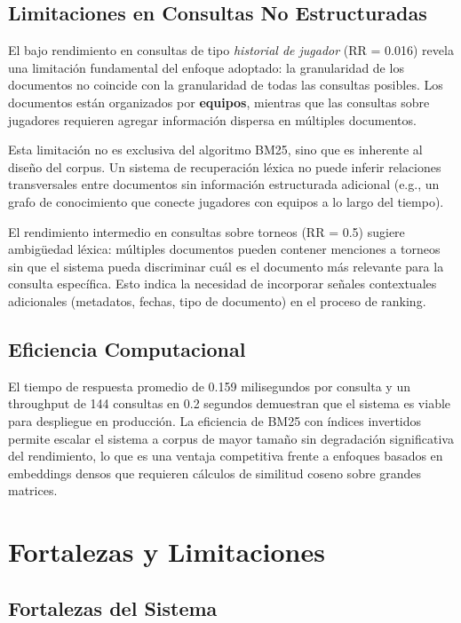 \subsection{Limitaciones en Consultas No Estructuradas}

El bajo rendimiento en consultas de tipo \textit{historial de jugador} (RR = 0.016) revela una limitación fundamental del enfoque adoptado: la granularidad de los documentos no coincide con la granularidad de todas las consultas posibles. Los documentos están organizados por \textbf{equipos}, mientras que las consultas sobre jugadores requieren agregar información dispersa en múltiples documentos.

Esta limitación no es exclusiva del algoritmo BM25, sino que es inherente al diseño del corpus. Un sistema de recuperación léxica no puede inferir relaciones transversales entre documentos sin información estructurada adicional (e.g., un grafo de conocimiento que conecte jugadores con equipos a lo largo del tiempo).

El rendimiento intermedio en consultas sobre torneos (RR = 0.5) sugiere ambigüedad léxica: múltiples documentos pueden contener menciones a torneos sin que el sistema pueda discriminar cuál es el documento más relevante para la consulta específica. Esto indica la necesidad de incorporar señales contextuales adicionales (metadatos, fechas, tipo de documento) en el proceso de ranking.

\subsection{Eficiencia Computacional}

El tiempo de respuesta promedio de 0.159 milisegundos por consulta y un throughput de 144 consultas en 0.2 segundos demuestran que el sistema es viable para despliegue en producción. La eficiencia de BM25 con índices invertidos permite escalar el sistema a corpus de mayor tamaño sin degradación significativa del rendimiento, lo que es una ventaja competitiva frente a enfoques basados en embeddings densos que requieren cálculos de similitud coseno sobre grandes matrices.

\section{Fortalezas y Limitaciones}

\subsection{Fortalezas del Sistema}

